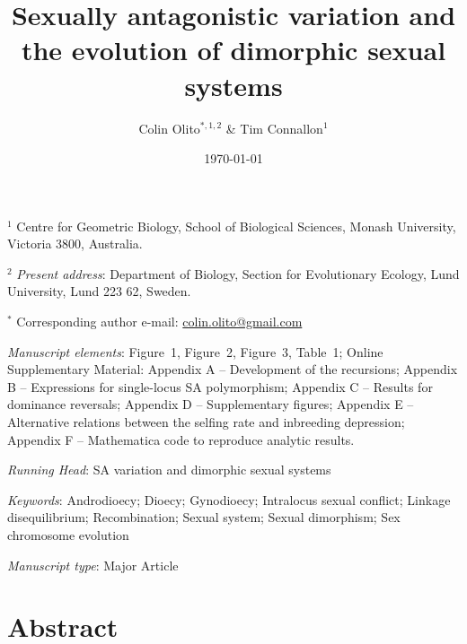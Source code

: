 \documentclass{article}
\title{Sexually antagonistic variation and the evolution of dimorphic sexual systems}
\author{Colin Olito$^{\ast,1,2}$ \& Tim Connallon$^{1}$}
\date{\today}
\begin{document}
\maketitle


\noindent{} $^{1}$ Centre for Geometric Biology, School of Biological Sciences, Monash University, Victoria 3800, Australia.

\noindent{} $^{2}$ \textit{Present address}: Department of Biology, Section for Evolutionary Ecology, Lund University, Lund 223 62, Sweden.

\noindent{} $^{\ast}$ Corresponding author e-mail: \url{colin.olito@gmail.com}

\bigskip

\noindent{} \textit{Manuscript elements}: Figure~1, Figure~2, Figure~3, Table~1; Online Supplementary Material: Appendix A -- Development of the recursions; Appendix B -- Expressions for single-locus SA polymorphism; Appendix C -- Results for dominance reversals; Appendix D -- Supplementary figures; Appendix E -- Alternative relations between the selfing rate and inbreeding depression; Appendix F -- Mathematica code to reproduce analytic results.

\bigskip
\noindent{} \textit{Running Head}: SA variation and dimorphic sexual systems

\bigskip

\noindent{} \textit{Keywords}: Androdioecy; Dioecy; Gynodioecy; Intralocus sexual conflict; Linkage disequilibrium; Recombination; Sexual system; Sexual dimorphism; Sex chromosome evolution

\bigskip

\noindent{} \textit{Manuscript type}: Major Article

\bigskip


\linenumbers
\modulolinenumbers[1]
\renewcommand\linenumberfont{\normalfont\small}


\newpage{}
\section*{Abstract}
\end{document}
